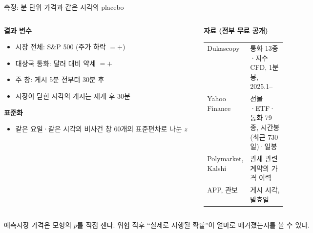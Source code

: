 \documentclass[aspectratio=169,9pt,t]{beamer}
\newcommand{\takeaway}[1]{%
  \par\vfill
  \noindent{\color{navy}\vrule width 1.6pt}\hspace{2.6mm}%
  \begin{minipage}[c]{\dimexpr\linewidth-5mm\relax}\small\linespread{1.15}\selectfont\RaggedRight #1\end{minipage}\par\vspace{1.2mm}}
\newcommand{\lab}[1]{{\small\bfseries\color{navy}#1}}
\renewcommand{\arraystretch}{1.3}
\newcommand{\tfs}{\fontsize{7.5}{9.4}\selectfont\renewcommand{\arraystretch}{1.18}}
\begin{document}
\begin{frame}{측정: 분 단위 가격과 같은 시각의 placebo}
\begin{columns}[T,onlytextwidth]
\begin{column}{0.48\textwidth}
\lab{결과 변수}
\begin{itemize}
\item 시장 전체: S\&P 500 (주가 하락 $=+$)
\item 대상국 통화: 달러 대비 약세 $=+$
\item 주 창: 게시 5분 전부터 30분 후
\item 시장이 닫힌 시각의 게시는 재개 후 30분
\end{itemize}
\vspace{1mm}
\lab{표준화}
\begin{itemize}
\item 같은 요일·같은 시각의 비사건 창 60개의 표준편차로 나눈 $z$
\end{itemize}
\end{column}
\begin{column}{0.48\textwidth}
\lab{자료 (전부 무료 공개)}\par\vspace{1mm}
\begingroup\tfs
\begin{tabularx}{\linewidth}{@{}L{0.36\linewidth}Y@{}}
\toprule
Dukascopy & 통화 13종·지수 CFD, 1분봉, 2025.1--\\
Yahoo Finance & 선물·ETF·통화 79종, 시간봉(최근 730일)·일봉\\
Polymarket, Kalshi & 관세 관련 계약의 가격 이력\\
APP, 관보 & 게시 시각, 발효일\\
\bottomrule
\end{tabularx}\endgroup
\end{column}
\end{columns}
\takeaway{예측시장 가격은 모형의 $p$를 직접 잰다. 위협 직후 ``실제로 시행될 확률''이 얼마로 매겨졌는지를 볼 수 있다.}
\end{frame}
\end{document}
